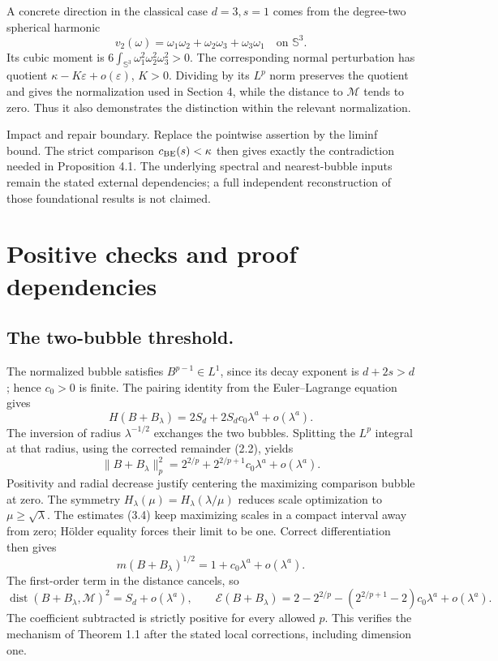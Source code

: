 \documentclass[10pt]{article}
\begin{document}
A concrete direction in the classical case \(d=3,s=1\) comes from the degree-two spherical harmonic \[v_2(\omega)=\omega_1\omega_2+\omega_2\omega_3+\omega_3\omega_1
 \quad\text{on }\mathbb S^3.\] Its cubic moment is \(6\int_{\mathbb S^3}\omega_1^2\omega_2^2\omega_3^2>0\). The corresponding normal perturbation has quotient \(\kappa-K\varepsilon+o(\varepsilon)\), \(K>0\). Dividing by its \(L^p\) norm preserves the quotient and gives the normalization used in Section 4, while the distance to \(\mathcal M\) tends to zero. Thus it also demonstrates the distinction within the relevant normalization.\par
Impact and repair boundary. Replace the pointwise assertion by the liminf bound. The strict comparison \(c_{\rm BE}(s)<\kappa\) then gives exactly the contradiction needed in Proposition 4.1. The underlying spectral and nearest-bubble inputs remain the stated external dependencies; a full independent reconstruction of those foundational results is not claimed.\par
\section*{Positive checks and proof dependencies}
\subsection*{The two-bubble threshold.}
The normalized bubble satisfies \(B^{p-1}\in L^1\), since its decay exponent is \(d+2s>d\); hence \(c_0>0\) is finite. The pairing identity from the Euler–Lagrange equation gives \[H(B+B_\lambda)=2S_d+2S_dc_0\lambda^a+o(\lambda^a).\] The inversion of radius \(\lambda^{-1/2}\) exchanges the two bubbles. Splitting the \(L^p\) integral at that radius, using the corrected remainder (2.2), yields \[\|B+B_\lambda\|_p^2
 =2^{2/p}+2^{2/p+1}c_0\lambda^a+o(\lambda^a).\] Positivity and radial decrease justify centering the maximizing comparison bubble at zero. The symmetry \(H_\lambda(\mu)=H_\lambda(\lambda/\mu)\) reduces scale optimization to \(\mu\ge\sqrt\lambda\). The estimates (3.4) keep maximizing scales in a compact interval away from zero; Hölder equality forces their limit to be one. Correct differentiation then gives \[m(B+B_\lambda)^{1/2}=1+c_0\lambda^a+o(\lambda^a).\] The first-order term in the distance cancels, so \[\operatorname{dist}(B+B_\lambda,\mathcal M)^2=S_d+o(\lambda^a),\qquad
 \mathcal E(B+B_\lambda)
 =2-2^{2/p}-(2^{2/p+1}-2)c_0\lambda^a+o(\lambda^a).\] The coefficient subtracted is strictly positive for every allowed \(p\). This verifies the mechanism of Theorem 1.1 after the stated local corrections, including dimension one.\par
\end{document}
